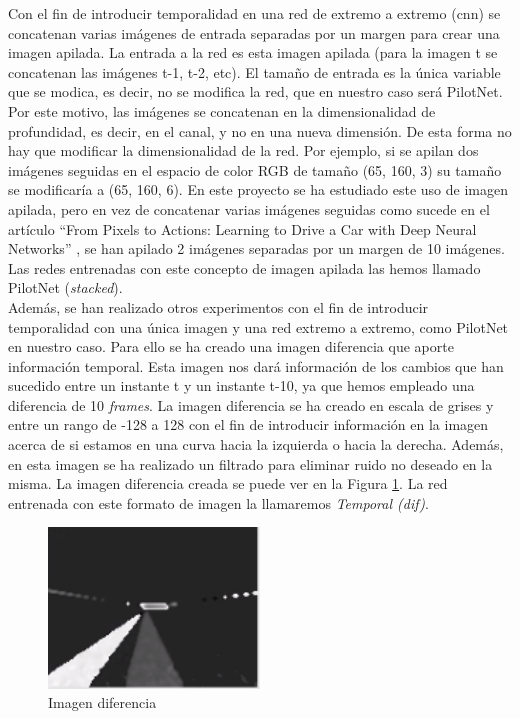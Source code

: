 Con el fin de introducir temporalidad en una red de extremo a extremo (\acrshort{cnn}) se concatenan varias imágenes de entrada separadas por un margen para crear una imagen apilada. La entrada a la red es esta imagen apilada (para la imagen t se concatenan las imágenes t-1, t-2, etc). El tamaño de entrada es la única variable que se modica, es decir, no se modifica la red, que en nuestro caso será PilotNet. Por este motivo, las imágenes se concatenan en la dimensionalidad de profundidad, es decir, en el canal, y no en una nueva dimensión. De esta forma no hay que modificar la dimensionalidad de la red. Por ejemplo, si se apilan dos imágenes seguidas en el espacio de color RGB de tamaño (65, 160, 3) su tamaño se modificaría a (65, 160, 6). En este proyecto se ha estudiado este uso de imagen apilada, pero en vez de concatenar varias imágenes seguidas como sucede en el artículo ``From Pixels to Actions: Learning to Drive a Car with Deep Neural Networks'' \cite{pixels}, se han apilado 2 imágenes separadas por un margen de 10 imágenes. Las redes entrenadas con este concepto de imagen apilada las hemos llamado PilotNet (\textit{stacked}).\\

Además, se han realizado otros experimentos con el fin de introducir temporalidad con una única imagen y una red extremo a extremo, como PilotNet en nuestro caso. Para ello se ha creado una imagen diferencia que aporte información temporal. Esta imagen nos dará información de los cambios que han sucedido entre un instante t y un instante t-10, ya que hemos empleado una diferencia de 10 \textit{frames}. La imagen diferencia se ha creado en escala de grises y entre un rango de -128 a 128 con el fin de introducir información en la imagen acerca de si estamos en una curva hacia la izquierda o hacia la derecha. Además, en esta imagen se ha realizado un filtrado para eliminar ruido no deseado en la misma. La imagen diferencia creada se puede ver en la Figura \ref{fig.diferencia_reg}. La red entrenada con este formato de imagen la llamaremos \textit{Temporal (dif)}.\\

\begin{figure}
\begin{center}
	\includegraphics[width=0.5\textwidth]{figures/Regresion/dif_gray_128.png}
   \caption{Imagen diferencia}
	\label{fig.diferencia_reg}
\end{center}
\end{figure}

